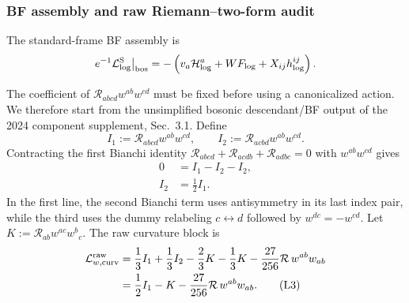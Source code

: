 \documentclass[11pt]{article}
\newcommand{\cL}{\mathcal L}
\newcommand{\cR}{\mathcal R}
\newcommand{\Log}{\log}
\newcommand{\std}{\mathrm S}
\begin{document}
\subsubsection{BF assembly and raw Riemann--two-form audit}

The standard-frame BF assembly is
\begin{equation}
e^{-1}\cL_{\Log}^{\std}\big|_{\rm bos}
=-\left(v_a\mathcal H_{\Log}^a+WF_{\Log}+X_{ij}h_{\Log}^{ij}\right).
\end{equation}

The coefficient of \(\cR_{abcd}w^{ab}w^{cd}\) must be fixed before using a
canonicalized action.  We therefore start from the unsimplified bosonic
descendant/BF output of the 2024 component supplement, Sec.~3.1.  Define
\begin{equation*}
I_1:=\cR_{abcd}w^{ab}w^{cd},\qquad
I_2:=\cR_{acbd}w^{ab}w^{cd}.
\tag{L1}\label{eq:L-I12}
\end{equation*}
Contracting the first Bianchi identity
\(\cR_{abcd}+\cR_{acdb}+\cR_{adbc}=0\) with
\(w^{ab}w^{cd}\) gives
\begin{align*}
0&=I_1-I_2-I_2,
\nonumber\\
I_2&=\frac12 I_1.
\tag{L2}\label{eq:L-I2identity}
\end{align*}
In the first line, the second Bianchi term uses antisymmetry in its last
index pair, while the third uses the dummy relabeling \(c\leftrightarrow d\)
followed by \(w^{dc}=-w^{cd}\).
Let \(K:=\cR_{ab}w^{ac}w^b{}_c\).  The raw curvature block is
\begin{align*}
\cL_{w,\rm curv}^{\rm raw}
&=\frac13I_1+\frac13I_2-\frac23K-\frac13K
-\frac{27}{256}\cR\,w^{ab}w_{ab}
\nonumber\\
&=\frac12I_1-K-\frac{27}{256}\cR\,w^{ab}w_{ab}.
\tag{L3}\label{eq:L-explicit-Rww}
\end{align*}
\end{document}
